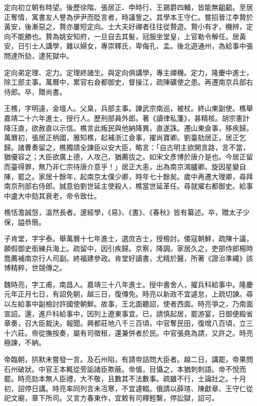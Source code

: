 \begin{pinyinscope}
定向初立朝有時望。後歷徐階、張居正、申時行、王錫爵四輔，皆能無齟齬。至居正奪情，寓書友人譽為伊尹而貶言者，時議訾之。其學本王守仁。嘗招晉江李贄於黃安，後漸惡之，贄亦屢短定向。士大夫好禪者往往從贄遊。贄小有才，機辨，定向不能勝也。贄為姚安知府，一旦自去其髮，冠服坐堂皇，上官勒令解任。居黃安，日引士人講學，雜以婦女，專崇釋氏，卑侮孔、孟。後北遊通州，為給事中張問達所劾，逮死獄中。

定向弟定理、定力。定理終諸生。與定向俱講學，專主禪機。定力，隆慶中進士，除工部主事。萬曆中，累官右僉都御史，督操江，疏陳礦使之患。再遷南京兵部右侍郎。卒，贈尚書。

王樵，字明遠，金壇人。父臬，兵部主事。諫武宗南巡，被杖。終山東副使。樵舉嘉靖二十六年進士，授行人。歷刑部員外郎。著《讀律私箋》，甚精核。胡宗憲計降汪直，欲赦直以示信。樵言此叛民與他納降異，直遂誅。遷山東僉事，移疾歸。萬曆初，張居正柄國，雅知樵，起補浙江僉事，擢尚寶卿。劉臺劾居正，居正乞歸。諸曹奏留之，樵獨請全諫臣以安大臣，略言：「自古明主欲開言路，言不當，猶優容之；大臣欲廣上德，人攻己，猶薦拔之。如宋文彥博於唐介是也。今居正留而臺得罪，無乃非仁宗待唐介意乎！」居正大恚，出為南京鴻臚卿。旋因星變自陳，罷之。家居十餘年，起南京太僕少卿，時年七十餘矣。歲中再遷大理卿，尋拜南京刑部右侍郎。誠意伯劉世延主使殺人，樵當世延革任。尋就擢右都御史。給事中盧大中劾其衰老，帝令致仕。

樵恬澹誠愨，溫然長者。邃經學，《易》、《書》、《春秋》皆有纂述。卒，贈太子少保，謚恭簡。

子肯堂，字宇泰。舉萬曆十七年進士，選庶吉士，授檢討。倭寇朝鮮，疏陳十議，願假御史銜練兵海上。疏留中，因引疾歸。京察，降調。家居久之，吏部侍郎楊時喬薦補南京行人司副。終福建參政。肯堂好讀書，尤精於醫，所著《證治準繩》該博精粹，世競傳之。

魏時亮，字工甫，南昌人。嘉靖三十八年進士。授中書舍人，擢兵科給事中。隆慶元年正月七日，有詔免朝，越三日，復傳免。時亮以新政不宜遽怠，上疏切諫。尋以左給事中副檢討許國使朝鮮。故事，王北面聽詔，使者西面。時亮爭之，乃南面宣詔。還，進戶科給事中，因列上遼東事宜。已，請慎起居，罷游宴，日御便殿省章奏，召大臣裁決。報聞。興都莊地八千三百頃，中官奪民田，復增八百頃，立三十六莊。帝從撫按奏，屬有司徵租，還兼併者於民。中官張堯為請，又許之。時亮極諫，不納。

帝臨朝，拱默未嘗發一言。及石州陷，有請帝詰問大臣者。越二日，講罷，帝果問石州破狀。中官王本輒從旁詬諸臣欺蔽。帝慍，目懾之，本猶刺刺語。帝不悅而罷。時亮劾本無人臣禮，大不敬，且數其不法數事。疏雖不行，士論壯之。十月初，詔停日講。時亮率同列言未冱寒，不宜遽輟。俄請以薛瑄、陳獻章、王守仁從祀文廟，章下所司。又言方春東作，宜敕有司釋輕繫，停訟獄，詔可。


\end{pinyinscope}
